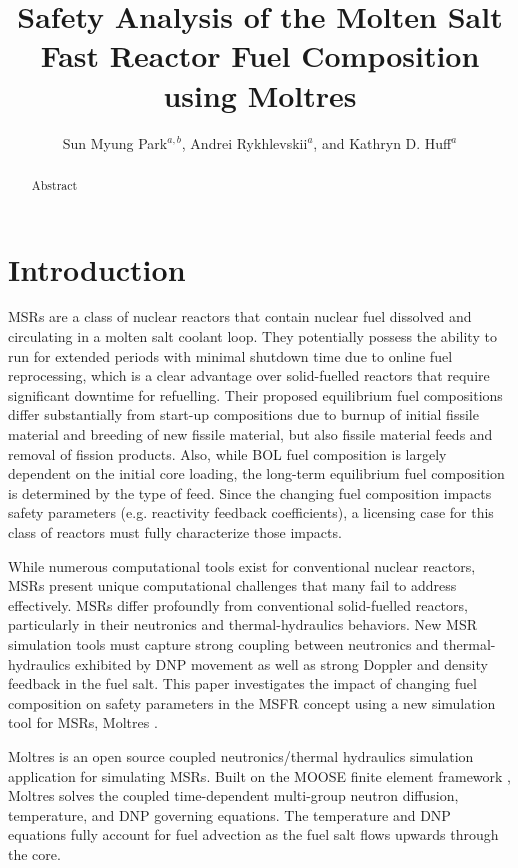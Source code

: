 \documentclass{anstrans}
\title{Safety Analysis of the Molten Salt Fast Reactor Fuel Composition using Moltres}
\author{Sun Myung Park$^{a,b}$, Andrei Rykhlevskii$^a$, and Kathryn D. Huff$^a$}
\institute{$^a$Dept. of Nuclear, Plasma and Radiological Engineering, University of Illinois at Urbana-Champaign \\
$^b$smpark3@illinois.edu}
\begin{document}
\begin{abstract}
%
    Abstract
\end{abstract}

\section{Introduction}

	\glspl{MSR} are a class of nuclear reactors that
	contain nuclear fuel dissolved and circulating in a molten salt coolant
	loop.
	They potentially possess the ability to run for extended 
    periods with minimal shutdown time due to online fuel reprocessing, which
    is a clear advantage over solid-fuelled reactors that require significant
    downtime for refuelling.
    Their proposed equilibrium fuel compositions differ substantially from
    start-up compositions due to burnup of initial fissile material and 
    breeding of new fissile material, but also fissile material feeds and 
    removal of fission products. Also, while \gls{BOL} fuel composition is
    largely dependent on the initial core loading, the long-term equilibrium
    fuel composition is determined by the type of feed.
    Since the changing fuel composition 
    impacts safety parameters (e.g. reactivity feedback coefficients), a 
    licensing case for this class of reactors  must fully characterize 
    those impacts.

	While numerous computational tools exist for conventional nuclear reactors, 
    \glspl{MSR} present unique computational challenges that many fail to 
    address effectively. \glspl{MSR} differ
    profoundly from conventional 
    solid-fuelled reactors, particularly in their neutronics and 
    thermal-hydraulics behaviors.  New \gls{MSR} simulation tools must 
    capture strong coupling between neutronics and thermal-hydraulics 
    exhibited by \gls{DNP} movement as well as strong 
    Doppler and density feedback in the fuel salt.  This paper investigates 
    the impact of changing fuel composition on safety parameters in the 
    \gls{MSFR} concept using a new simulation tool for \glspl{MSR}, Moltres 
    \cite{lindsay_introduction_2018}.
    
    Moltres is an open source coupled neutronics/thermal hydraulics simulation 
    application for simulating \glspl{MSR}. Built on the \gls{MOOSE} finite 
    element framework \cite{gaston_moose:_2009}, Moltres solves the coupled 
    time-dependent multi-group neutron diffusion, temperature, and 
    \gls{DNP} governing equations.  The temperature and \gls{DNP} equations
    fully 
    account for fuel advection as the fuel salt flows upwards through the 
    core.
    
\end{document}
